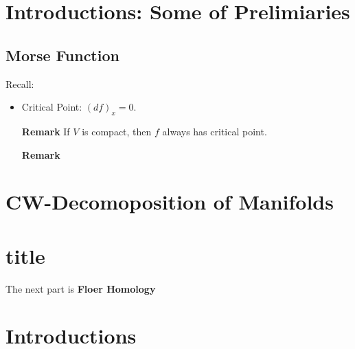 \documentclass[Total.tex]{subfiles}
\begin{document}
	\chapter{Introductions: Some of Prelimiaries}
		\section{Morse Function}
			Recall:
			
			\begin{itemize}
				\item Critical Point: $(df)_x=0$.
				
				\textbf{Remark} If $V$ is compact, then $f$ always has critical point.
				
				\textbf{Remark}
			\end{itemize}
	\chapter{CW-Decomoposition of Manifolds}
	\chapter{title}
	
	\newpage The next part is \textbf{Floer Homology}
	\chapter{Introductions}
\end{document}
